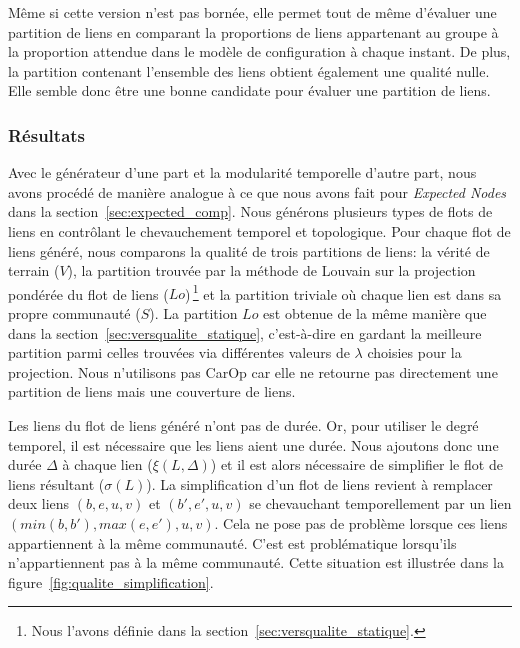  

Même si cette version n'est pas bornée, elle permet tout de même d'évaluer une partition de liens en comparant la proportions de liens appartenant au groupe à la proportion attendue dans le modèle de configuration à chaque instant.
De plus, la partition contenant l'ensemble des liens obtient également une qualité nulle.
Elle semble donc être une bonne candidate pour évaluer une partition de liens.

\subsubsection{Résultats}

Avec le générateur d'une part et la modularité temporelle d'autre part, nous avons procédé de manière analogue à ce que nous avons fait pour \emph{Expected Nodes} dans la section~\ref{sec:expected_comp}.
Nous générons plusieurs types de flots de liens en contrôlant le chevauchement temporel et topologique.
Pour chaque flot de liens généré, nous comparons la qualité de trois partitions de liens: la vérité de terrain ($V$), la partition trouvée par la méthode de Louvain sur la projection pondérée du flot de liens ($Lo$)\,\footnote{Nous l'avons définie dans la section~\ref{sec:versqualite_statique}.} et la partition triviale où chaque lien est dans sa propre communauté ($S$).
La partition $Lo$ est obtenue de la même manière que dans la section~\ref{sec:versqualite_statique}, c'est-à-dire en gardant la meilleure partition parmi celles trouvées via différentes valeurs de $\lambda$ choisies pour la projection.
Nous n'utilisons pas CarOp car elle ne retourne pas directement une partition de liens mais une couverture de liens.

Les liens du flot de liens généré n'ont pas de durée.
Or, pour utiliser le degré temporel, il est nécessaire que les liens aient une durée.
Nous ajoutons donc une durée $\Delta$ à chaque lien ($\xi(L,\Delta)$) et il est alors nécessaire de simplifier le flot de liens résultant ($\sigma(L)$).
La simplification d'un flot de liens revient à remplacer deux liens $(b,e,u,v)$ et $(b',e',u,v)$ se chevauchant temporellement par un lien $(min(b,b'),max(e,e'),u,v)$.
Cela ne pose pas de problème lorsque ces liens appartiennent à la même communauté.
C'est est problématique lorsqu'ils n'appartiennent pas à la même communauté.
Cette situation est illustrée dans la figure~\ref{fig:qualite_simplification}.

